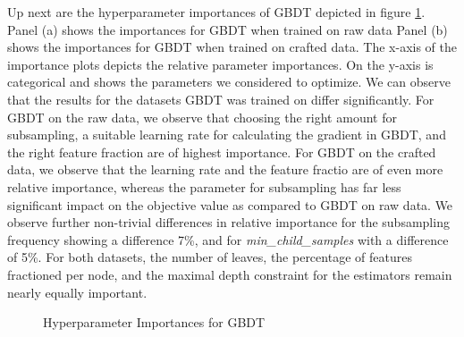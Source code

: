 Up next are the hyperparameter importances of GBDT depicted in figure \ref{fig:GBDT_Importances}. Panel (a) shows the importances for GBDT when trained on raw data
Panel (b) shows the importances for GBDT when trained on crafted data.
The x-axis of the importance plots depicts the relative parameter importances. 
On the y-axis is categorical and shows the parameters we considered to optimize. 
We can observe that the results for the datasets GBDT was trained on differ significantly. 
For GBDT on the raw data, we observe that choosing the right amount for subsampling, a suitable learning rate for calculating the gradient in GBDT, and the right feature fraction are of highest importance. For GBDT on the crafted data, we observe that the learning rate and the feature fractio are of even more relative importance, whereas the parameter for subsampling has far less significant impact on the objective value as compared to GBDT on raw data. 
We observe further non-trivial differences in relative importance for the subsampling frequency showing a difference 7\%, and for \textit{min\_child\_samples} with a difference of 5\%. For both datasets, the number of leaves, the percentage of features fractioned per node, and the maximal depth constraint for the estimators remain nearly equally important.   
\begin{figure}[h]
	\centering
	\caption{Hyperparameter Importances for GBDT}
	\label{fig:GBDT_Importances}
\end{figure}

